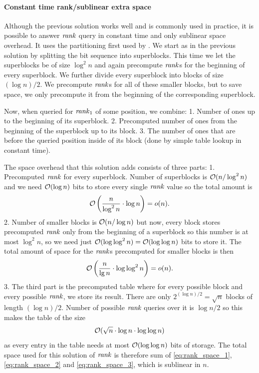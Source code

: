 \paragraph{Constant time rank/sublinear extra space}

Although the previous solution works well and is commonly used in practice, it is possible to
answer $\mathit{rank}$ query in constant time and only sublinear space overhead. It uses the partitioning first
used by \cite{okanohara2007practical}. We start as in the previous solution by splitting
the bit sequence into superblocks. This time we let the superblocks be of size $\log^2 n$
and again precompute $\mathit{rank}$s for the beginning of every superblock. We further divide every
superblock into blocks of size $(\log n)/2$. We precompute $\mathit{rank}$s for all of these
smaller blocks, but to save space, we only precompute it from the beginning of the corresponding
superblock.

Now, when queried for $\mathit{rank}_1$ of some position, we combine:
1. Number of ones up to the beginning of its superblock.
2. Precomputed number of ones from the beginning of the superblock up to its block.
3. The number of ones that are before the queried position inside of its block (done by simple
table lookup in constant time).

The space overhead that this solution adds consists of three parts:
1. Precomputed $\mathit{rank}$ for every superblock. Number of superblocks is $\mathcal{O}(n/\log^2 n)$
and we need $\mathcal{O}(\log n)$ bits to store every single $\mathit{rank}$ value so the total amount is
\begin{equation}
    \mathcal{O}\left(\frac{n}{\log^2 n}\cdot \log n\right) = o(n).
    \label{eq:rank_space_1}
\end{equation}
2. Number of smaller blocks is $\mathcal{O}(n/\log n)$ but now, every block stores precomputed $\mathit{rank}$ only from the
beginning of a superblock so this number is at most $\log^2 n$, so we need just $\mathcal{O}(\log\log^2 n)=\mathcal{O}(\log\log n)$
bits to store it. The total amount of space for the $\mathit{rank}$s precomputed for smaller blocks is then
\begin{equation}
    \mathcal{O}\left(\frac{n}{\lg n}\cdot \log\log^2 n\right)=o(n).
    \label{eq:rank_space_2}
\end{equation}
3. The third part is the precomputed table where for every possible block and every
possible $\mathit{rank}$, we store its result. There are only $2^{(\log n)/2} = \sqrt{n}$ blocks of length 
$(\log n)/2$. Number of possible $\mathit{rank}$ queries over it is $\log n/2$ so this makes the table of the size
\begin{equation}
    \mathcal{O}(\sqrt{n}\cdot \log n\cdot \log\log n)
    \label{eq:rank_space_3}
\end{equation}
as every entry in the table needs at most $\mathcal{O}(\log\log n)$ bits of storage. The total space used for
this solution of $\mathit{rank}$ is therefore sum of \ref{eq:rank_space_1}, \ref{eq:rank_space_2} and
\ref{eq:rank_space_3}, which is sublinear in $n$.


